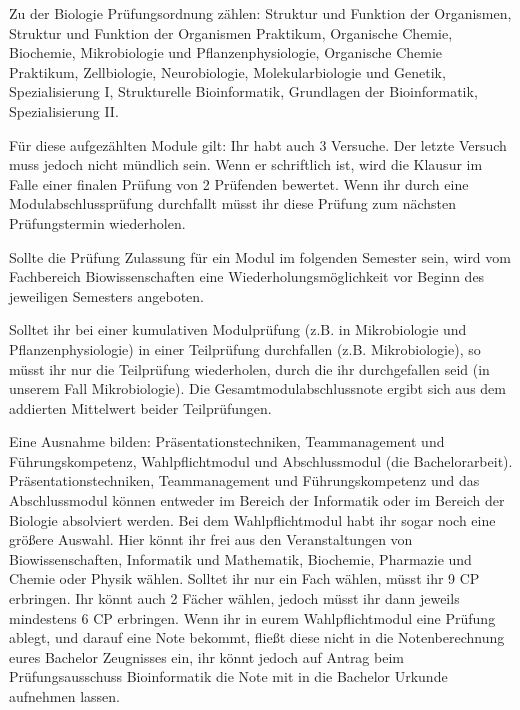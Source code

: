
Zu der Biologie Prüfungsordnung zählen: Struktur und Funktion der Organismen, Struktur und Funktion der Organismen Praktikum, Organische Chemie, Biochemie, Mikrobiologie und Pflanzenphysiologie, Organische Chemie Praktikum, Zellbiologie, Neurobiologie, Molekularbiologie und Genetik, Spezialisierung I, Strukturelle Bioinformatik, Grundlagen der Bioinformatik, Spezialisierung II.


Für diese aufgezählten Module gilt: Ihr habt auch 3 Versuche. Der letzte Versuch muss jedoch nicht mündlich sein. Wenn er schriftlich ist, wird die Klausur im Falle einer finalen Prüfung von 2 Prüfenden bewertet. Wenn ihr durch eine Modulabschlussprüfung durchfallt müsst ihr diese Prüfung zum nächsten Prüfungstermin wiederholen.


 Sollte die Prüfung Zulassung für ein Modul im folgenden Semester sein, wird vom Fachbereich Biowissenschaften eine Wiederholungsmöglichkeit vor Beginn des jeweiligen Semesters angeboten.

Solltet ihr bei einer kumulativen Modulprüfung (z.B. in Mikrobiologie und Pflanzenphysiologie) in einer Teilprüfung durchfallen (z.B. Mikrobiologie), so müsst ihr nur die Teilprüfung wiederholen, durch die ihr durchgefallen seid (in unserem Fall Mikrobiologie). Die Gesamtmodulabschlussnote ergibt sich aus dem addierten Mittelwert beider Teilprüfungen.

Eine Ausnahme bilden: Präsentationstechniken, Teammanagement und Führungskompetenz, Wahlpflichtmodul und Abschlussmodul (die Bachelorarbeit). Präsentationstechniken, Teammanagement und Führungskompetenz und das Abschlussmodul können entweder im Bereich der Informatik oder im Bereich der Biologie absolviert werden. Bei dem Wahlpflichtmodul habt ihr sogar noch eine größere Auswahl. Hier könnt ihr frei aus den Veranstaltungen von Biowissenschaften, Informatik und Mathematik, Biochemie, Pharmazie und Chemie oder Physik wählen. Solltet ihr nur ein Fach wählen, müsst ihr 9 CP erbringen. Ihr könnt auch 2 Fächer wählen, jedoch müsst ihr dann jeweils mindestens 6 CP erbringen. Wenn ihr in eurem Wahlpflichtmodul eine Prüfung ablegt, und darauf eine Note bekommt, fließt diese nicht in die Notenberechnung eures Bachelor Zeugnisses ein, ihr könnt jedoch auf Antrag beim Prüfungsausschuss Bioinformatik die Note mit in die Bachelor Urkunde aufnehmen lassen.

